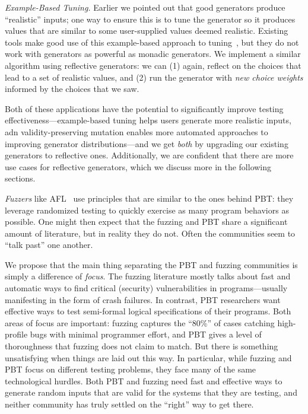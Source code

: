 {\em Example-Based Tuning.} Earlier we pointed out that good generators
produce ``realistic'' inputs; one way to ensure this is to tune the generator so
it produces values that are similar to some user-supplied values deemed
realistic. Existing tools make good use of this example-based approach to
tuning~\cite{soremekun2020inputs}, but they do not work with generators as
powerful as monadic generators. We implement a similar algorithm using
reflective generators: we can (1) again, reflect on the choices that lead to a
set of realistic values, and (2) run the generator with {\em new choice weights}
informed by the choices that we saw.

Both of these applications have the potential to significantly improve testing
effectiveness---example-based tuning helps users generate more realistic inputs,
adn validity-preserving mutation enables more automated approaches to improving
generator distributions---and we get {\em both} by upgrading our existing
generators to reflective ones. Additionally, we are confident that there are
more use cases for reflective generators, which we discuss more in the following
sections.

{\em Fuzzers} like AFL~\cite{afl-readme} use principles that are similar to the
ones behind PBT: they leverage randomized testing to quickly exercise as
many program behaviors as possible.  One might then expect that the fuzzing and
PBT share a significant amount of literature, but in reality they do not. Often
the communities seem to ``talk past'' one another.

We propose that the main thing separating the PBT and fuzzing communities is
simply a difference of {\em focus}. The fuzzing literature mostly talks about
fast and automatic ways to find critical (security) vulnerabilities in
programs---usually manifesting in the form of crash failures.  In contrast, PBT
researchers want effective ways to test semi-formal logical specifications of
their programs. Both areas of focus are important: fuzzing captures the ``80\%''
of cases catching high-profile bugs with minimal programmer effort, and PBT
gives a level of thoroughness that fuzzing does not claim to match. But there is
something unsatisfying when things are laid out this way. In particular, while
fuzzing and PBT focus on different testing problems, they face many of the same
technological hurdles. Both PBT and fuzzing need fast and effective ways to
generate random inputs that are valid for the systems that they are testing, and
neither community has truly settled on the ``right'' way to get there.

